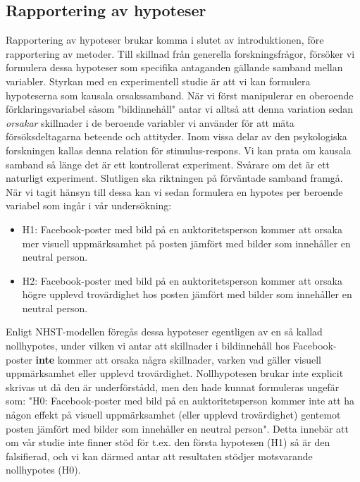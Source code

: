 \documentclass[
]{book}
\begin{document}
\hypertarget{sub06.3.2}{%
\subsection{Rapportering av hypoteser}\label{sub06.3.2}}

Rapportering av hypoteser brukar komma i slutet av introduktionen, före rapportering av metoder. Till skillnad från generella forskningsfrågor, försöker vi formulera dessa hypoteser som specifika antaganden gällande samband mellan variabler. Styrkan med en experimentell studie är att vi kan formulera hypoteserna som kausala orsakssamband. När vi först manipulerar en oberoende förklaringsvariabel såsom "bildinnehåll" antar vi alltså att denna variation sedan \emph{orsakar} skillnader i de beroende variabler vi använder för att mäta försöksdeltagarna beteende och attityder. Inom vissa delar av den psykologiska forskningen kallas denna relation för stimulus-respons. Vi kan prata om kausala samband så länge det är ett kontrollerat experiment. Svårare om det är ett naturligt experiment. Slutligen ska riktningen på förväntade samband framgå. När vi tagit hänsyn till dessa kan vi sedan formulera en hypotes per beroende variabel som ingår i vår undersökning:

\begin{itemize}
\item
  H1: Facebook-poster med bild på en auktoritetsperson kommer att orsaka mer visuell uppmärksamhet på posten jämfört med bilder som innehåller en neutral person.
\item
  H2: Facebook-poster med bild på en auktoritetsperson kommer att orsaka högre upplevd trovärdighet hos posten jämfört med bilder som innehåller en neutral person.
\end{itemize}

Enligt NHST-modellen föregås dessa hypoteser egentligen av en så kallad nollhypotes, under vilken vi antar att skillnader i bildinnehåll hos Facebook-poster \textbf{inte} kommer att orsaka några skillnader, varken vad gäller visuell uppmärksamhet eller upplevd trovärdighet. Nollhypotesen brukar inte explicit skrivas ut då den är underförstådd, men den hade kunnat formuleras ungefär som: "H0: Facebook-poster med bild på en auktoritetsperson kommer inte att ha någon effekt på visuell uppmärksamhet (eller upplevd trovärdighet) gentemot posten jämfört med bilder som innehåller en neutral person". Detta innebär att om vår studie inte finner stöd för t.ex. den första hypotesen (H1) så är den falsifierad, och vi kan därmed antar att resultaten stödjer motsvarande nollhypotes (H0).
\end{document}
